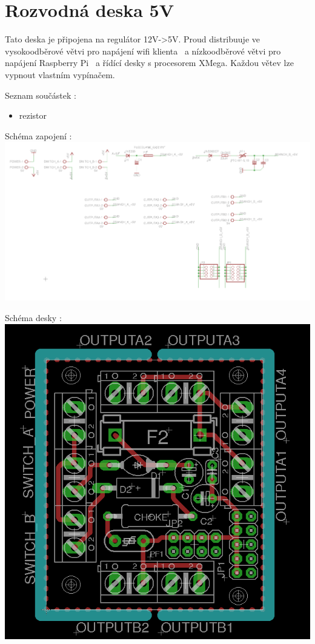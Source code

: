 \section{Rozvodná deska 5V} 

Tato deska je připojena na regulátor 12V->5V. Proud distribuuje ve vysokoodběrové větvi pro napájení wifi klienta ~a 
nízkoodběrové větvi pro napájení Raspberry Pi ~a řídící desky s procesorem XMega. Každou větev lze vypnout vlastním vypínačem.

Seznam součástek :

\begin{itemize}
	\item rezistor
\end{itemize} 

Schéma zapojení :\\

\includegraphics[scale=0.3]{./circuit_boards/img/schema/rozvod_5V.png}

Schéma desky :\\

\includegraphics[scale=0.5]{./circuit_boards/img/board/rozvod_5V.png}

